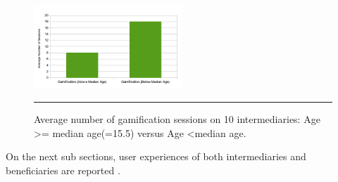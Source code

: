 \begin{figure}[htbp]
  \centering
    \includegraphics[width=0.5\textwidth]{Figures/gambyage_mod.png}
    \rule{35em}{0.5pt}
  \caption{Average number of gamification sessions on  10 intermediaries: Age \textgreater= median age(=15.5) versus Age \textless median age.}
  \label{figure:gambyage_mod}
\end{figure}\newline
On the next sub sections, user experiences of both intermediaries and beneficiaries are reported .
